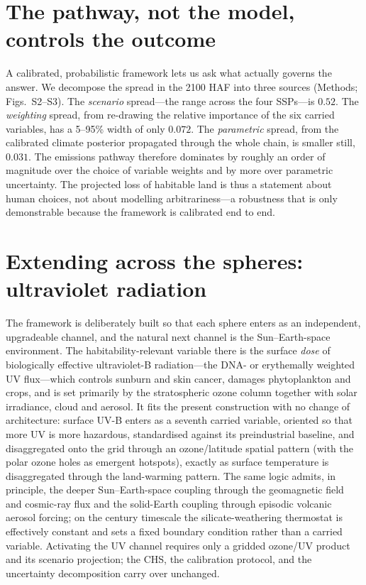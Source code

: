 \documentclass[10pt]{article}
\begin{document}
\section*{The pathway, not the model, controls the outcome}
A calibrated, probabilistic framework lets us ask what actually governs the
answer. We decompose the spread in the 2100 HAF into three sources (Methods;
Figs.~S2--S3). The \emph{scenario} spread—the range across the four SSPs—is
$0.52$. The \emph{weighting} spread, from re-drawing the relative importance of
the six carried variables, has a 5--95\% width of only $0.072$. The
\emph{parametric} spread, from the calibrated climate posterior propagated through
the whole chain, is smaller still, $0.031$. The emissions pathway therefore
dominates by roughly an order of magnitude over the choice of variable weights and
by more over parametric uncertainty. The projected loss of habitable land is thus
a statement about human choices, not about modelling arbitrariness—a robustness
that is only demonstrable because the framework is calibrated end to end.

\section*{Extending across the spheres: ultraviolet radiation}
The framework is deliberately built so that each sphere enters as an independent,
upgradeable channel, and the natural next channel is the Sun--Earth-space
environment. The habitability-relevant variable there is the surface \emph{dose}
of biologically effective ultraviolet-B radiation—the DNA- or erythemally weighted
UV flux—which controls sunburn and skin cancer, damages phytoplankton and crops,
and is set primarily by the stratospheric ozone column together with solar
irradiance, cloud and aerosol\citep{Barnes2019, Bais2018}. It fits the present
construction with no change of architecture: surface UV-B enters as a seventh
carried variable, oriented so that more UV is more hazardous, standardised against
its preindustrial baseline, and disaggregated onto the grid through an
ozone/latitude spatial pattern (with the polar ozone holes as emergent hotspots),
exactly as surface temperature is disaggregated through the land-warming pattern.
The same logic admits, in principle, the deeper Sun--Earth-space coupling through
the geomagnetic field and cosmic-ray flux and the solid-Earth coupling through
episodic volcanic aerosol forcing\citep{Robock2000}; on the century timescale the
silicate-weathering thermostat\citep{Walker1981} is effectively constant and sets
a fixed boundary condition rather than a carried variable. Activating the UV
channel requires only a gridded ozone/UV product and its scenario projection; the
CHS, the calibration protocol, and the uncertainty decomposition carry over
unchanged.
\end{document}
